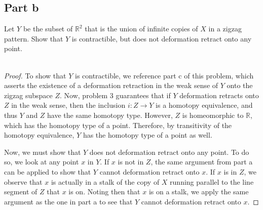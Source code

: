 \documentclass[fontsize=11pt]{scrartcl} %
\numberwithin{equation}{section} %
\numberwithin{figure}{section} %
\numberwithin{table}{section} %
\newcommand{\R}{\mathbb{R}}
\begin{document}
\subsection*{Part b}
Let $Y$ be the subset of $\R^2$ that is the union of infinite copies of $X$ in a
zigzag pattern. Show that $Y$ is contractible, but does not deformation retract
onto any point.
\\
\\
\begin{proof}
    To show that $Y$ is contractible, we reference part c of this problem, which
    asserts the existence of a deformation retraction in the weak sense of $Y$
    onto the zigzag subspace $Z$. Now, problem 3 guarantees that if $Y$
    deformation retracts onto $Z$ in the weak sense, then the inclusion $i:Z\to
    Y$ is a homotopy equivalence, and thus $Y$ and $Z$ have the same homotopy
    type. However, $Z$ is homeomorphic to $\R$, which has the homotopy type of a
    point. Therefore, by transitivity of the homotopy equivalence, $Y$ has the
    homotopy type of a point as well.

    Now, we must show that $Y$ does not deformation retract onto any point. To
    do so, we look at any point $x$ in $Y$. If $x$ is not in $Z$, the same
    argument from part a can be applied to show that $Y$ cannot deformation
    retract onto $x$. If $x$ is in $Z$, we observe that $x$ is actually in a
    stalk of the copy of $X$ running parallel to the line segment of $Z$ that
    $x$ is on. Noting then that $x$ is on a stalk, we apply the same argument as
    the one in part a to see that $Y$ cannot deformation retract onto $x$.
\end{proof}
\end{document}
